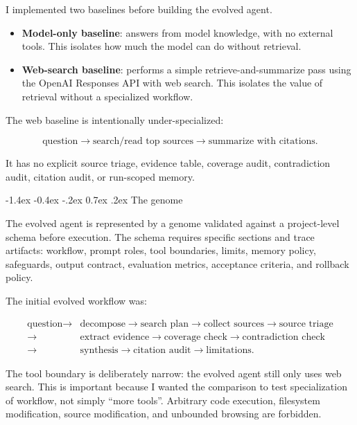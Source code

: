 \documentclass[10pt]{article}
\makeatletter
\renewcommand\subsection{\@startsection{subsection}{2}{\z@}%
  {-1.4ex \@plus -0.4ex \@minus -.2ex}%
  {0.7ex \@plus .2ex}%
  {\normalfont\normalsize\bfseries}}
\makeatother
\begin{document}
I implemented two baselines before building the evolved agent.

\begin{itemize}
    \item \textbf{Model-only baseline}: answers from model knowledge, with no external tools. This isolates how much the model can do without retrieval.
    \item \textbf{Web-search baseline}: performs a simple retrieve-and-summarize pass using the OpenAI Responses API with web search. This isolates the value of retrieval without a specialized workflow.
\end{itemize}

The web baseline is intentionally under-specialized:

\[
\text{question} \rightarrow \text{search/read top sources} \rightarrow \text{summarize with citations}.
\]

It has no explicit source triage, evidence table, coverage audit, contradiction audit, citation audit, or run-scoped memory.

\subsection{The genome}

The evolved agent is represented by a genome validated against a project-level schema before execution. The schema requires specific sections and trace artifacts: workflow, prompt roles, tool boundaries, limits, memory policy, safeguards, output contract, evaluation metrics, acceptance criteria, and rollback policy.

The initial evolved workflow was:

\[
\begin{split}
\text{question} \rightarrow & \text{decompose} \rightarrow \text{search plan} \rightarrow \text{collect sources} \rightarrow \text{source triage} \\
\rightarrow & \text{extract evidence} \rightarrow \text{coverage check} \rightarrow \text{contradiction check} \\
\rightarrow & \text{synthesis} \rightarrow \text{citation audit} \rightarrow \text{limitations}.
\end{split}
\]

The tool boundary is deliberately narrow: the evolved agent still only uses web search. This is important because I wanted the comparison to test specialization of workflow, not simply ``more tools''. Arbitrary code execution, filesystem modification, source modification, and unbounded browsing are forbidden.
\end{document}
